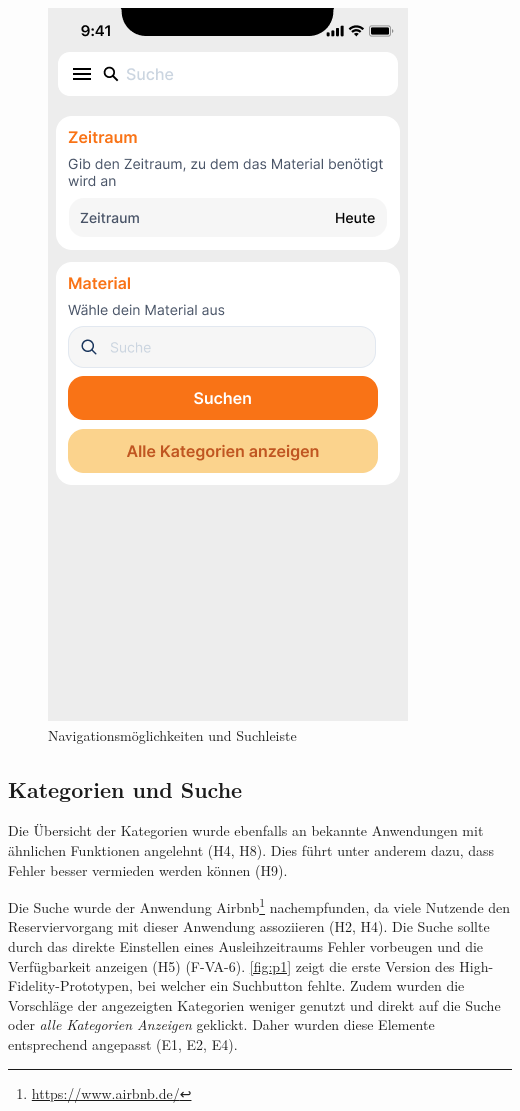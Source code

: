 \begin{figure}[h]
    \includegraphics[scale=0.3]{Bilder/Prototyp/Neu/Suche V2.png}
    \caption[-]{Navigationsmöglichkeiten und Suchleiste}
    \label{fig:nav}
\end{figure}

\subsection{Kategorien und Suche}
Die Übersicht der Kategorien wurde ebenfalls an bekannte Anwendungen mit
ähnlichen Funktionen angelehnt (H4, H8). Dies führt unter anderem dazu,
dass Fehler besser vermieden werden können (H9).

Die Suche wurde der Anwendung Airbnb\footnote{\url{https://www.airbnb.de/}}
nachempfunden, da viele Nutzende den Reserviervorgang mit dieser Anwendung
assoziieren (H2, H4). Die Suche sollte durch das direkte Einstellen eines
Ausleihzeitraums Fehler vorbeugen und die Verfügbarkeit anzeigen (H5) (F-VA-6).
\ref{fig:p1} zeigt die erste Version des High-Fidelity-Prototypen, bei welcher
ein Suchbutton fehlte. Zudem wurden die Vorschläge der angezeigten Kategorien
weniger genutzt und direkt auf die Suche oder \textit{alle Kategorien Anzeigen}
geklickt. Daher wurden diese Elemente entsprechend angepasst (E1, E2, E4).

